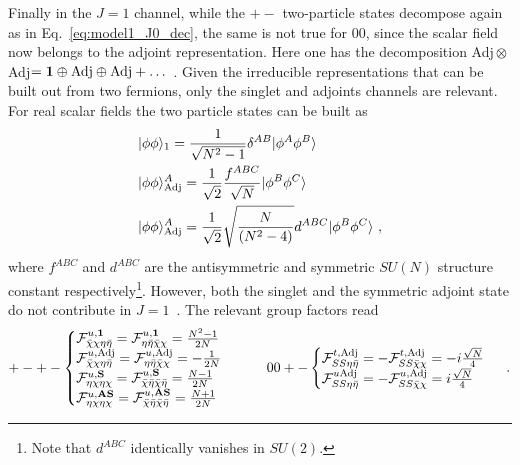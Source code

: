 \documentclass[a4paper,11pt]{article}
\newcommand{\nn}{\nonumber}
\begin{document}
Finally in the $J=1$ channel, while the $+-$ two-particle states decompose again as in Eq.~\eqref{eq:model1_J0_dec}, the same is not true for $00$, since the scalar field now belongs to the adjoint representation. Here one has the decomposition Adj\,$\otimes\,$Adj$={\bf 1}\oplus{\rm Adj}\oplus{\rm Adj}+\dots$ . Given the irreducible representations that can be built out from  two fermions, only the singlet and adjoints channels are relevant. For real scalar fields the two particle states can be built as
\begin{align}\label{eq:model3_J1_dec}
& |\phi\phi \rangle_1 =  \frac{1}{\sqrt{N^2-1}}\delta^{AB}|\phi^A \phi^B\rangle \nn \\
& |\phi\phi \rangle^A_{{\rm Adj}} =\frac{1}{\sqrt 2}  \frac{f^{ABC}}{\sqrt N}|\phi^B \phi^C\rangle \nn \\
& |\phi\phi \rangle^A_{{\rm Adj}} =\frac{1}{\sqrt 2}\sqrt{\frac{N}{(N^2-4)}} d^{ABC}|\phi^B \phi^{C}\rangle \ ,
\end{align}
where $f^{ABC}$ and $d^{ABC}$ are the antisymmetric and symmetric $SU(N)$ structure constant respectively\footnote{Note that $d^{ABC}$ identically vanishes in $SU(2)$.}.
However, both the singlet and the symmetric adjoint state do not contribute in $J=1$~\cite{Jacob:1959at}. The relevant group factors read
\begin{align}\label{eq:group_model3_J1}
+-+-
\begin{cases}
{\cal F}^{u,{\bf 1}}_{\bar \chi \chi \eta \bar \eta} = {\cal F}^{u,{\bf 1}}_{\eta \bar \eta \bar \chi \chi } = \frac{N^2-1}{2N} \\
%
{\cal F}^{u,{\rm Adj}}_{\bar \chi \chi \eta \bar \eta} = {\cal F}^{u,{\rm Adj}}_{\eta \bar \eta \bar \chi \chi } = - \frac{1}{2N}\\
%
{\cal F}^{u,{\rm {\bf S}}}_{\eta\chi\eta\chi} = {\cal F}^{u,{\rm {\bf S}}}_{\bar\chi\bar\eta\bar\chi\bar\eta} =  \frac{N-1}{2N}\\
%
{\cal F}^{u,{\rm {\bf AS}}}_{\eta\chi\eta\chi} = {\cal F}^{u,{\rm {\bf AS}}}_{\bar\chi\bar\eta\bar\chi\bar\eta} =  \frac{N+1}{2N}\\
\end{cases}
%
\qquad 
00+-
\begin{cases}
 {\cal F}^{t, \rm{Adj}}_{SS\eta\bar\eta } = - {\cal F}^{t, \rm{Adj}}_{SS\bar\chi \chi}  = -i \frac{\sqrt N}{4}  \\
  {\cal F}^{u \rm{Adj}}_{SS\eta\bar\eta } = - {\cal F}^{u, \rm{Adj}}_{SS\bar\chi \chi }  = i \frac{\sqrt N}{4}  \\
\end{cases} \ .
\end{align}
\end{document}
